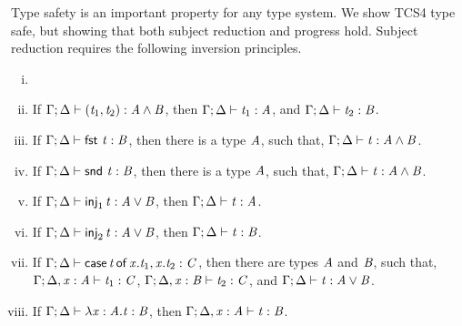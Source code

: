 Type safety is an important property for any type system.  We show
TCS4 type safe, but showing that both subject reduction and progress
hold.  Subject reduction requires the following inversion principles.
\begin{lemma}[Inversion]
  \label{lemma:inversion}
  \begin{enumerate}[i.]
  \item[]
  \item If $\Gamma  ;  \Delta  \vdash  (  \mathit{t_{{\mathrm{1}}}}  ,  \mathit{t_{{\mathrm{2}}}}  )  :   \mathit{A}  \land  \mathit{B} $, then $\Gamma  ;  \Delta  \vdash  \mathit{t_{{\mathrm{1}}}}  :  \mathit{A}$, and $\Gamma  ;  \Delta  \vdash  \mathit{t_{{\mathrm{2}}}}  :  \mathit{B}$.
  \item If $\Gamma  ;  \Delta  \vdash  \mathsf{fst}\, \, \mathit{t}  :  \mathit{B}$, then there is a type $\mathit{A}$, such that, $\Gamma  ;  \Delta  \vdash  \mathit{t}  :   \mathit{A}  \land  \mathit{B} $.
  \item If $\Gamma  ;  \Delta  \vdash  \mathsf{snd}\, \, \mathit{t}  :  \mathit{B}$, then there is a type $\mathit{A}$, such that, $\Gamma  ;  \Delta  \vdash  \mathit{t}  :   \mathit{A}  \land  \mathit{B} $.
  \item If $\Gamma  ;  \Delta  \vdash  \mathsf{inj}_1\,  \mathit{t}  :   \mathit{A}  \lor  \mathit{B} $, then $\Gamma  ;  \Delta  \vdash  \mathit{t}  :  \mathit{A}$.
  \item If $\Gamma  ;  \Delta  \vdash  \mathsf{inj}_2\,  \mathit{t}  :   \mathit{A}  \lor  \mathit{B} $, then $\Gamma  ;  \Delta  \vdash  \mathit{t}  :  \mathit{B}$.
  \item If $\Gamma  ;  \Delta  \vdash   \mathsf{case}\, \mathit{t} \,\mathsf{of}\, \mathit{x} . \mathit{t_{{\mathrm{1}}}} , \mathit{x} . \mathit{t_{{\mathrm{2}}}}   :  \mathit{C}$, then there are types $\mathit{A}$ and $\mathit{B}$,
    such that, $\Gamma  ;  \Delta  ,  \mathit{x}  :  \mathit{A}  \vdash  \mathit{t_{{\mathrm{1}}}}  :  \mathit{C}$, $\Gamma  ;  \Delta  ,  \mathit{x}  :  \mathit{B}  \vdash  \mathit{t_{{\mathrm{2}}}}  :  \mathit{C}$, and $\Gamma  ;  \Delta  \vdash  \mathit{t}  :   \mathit{A}  \lor  \mathit{B} $.
  \item If $\Gamma  ;  \Delta  \vdash   \lambda  \mathit{x}  :  \mathit{A} . \mathit{t}   :  \mathit{B}$, then $\Gamma  ;  \Delta  ,  \mathit{x}  :  \mathit{A}  \vdash  \mathit{t}  :  \mathit{B}$.    

\end{enumerate}
\end{lemma}
